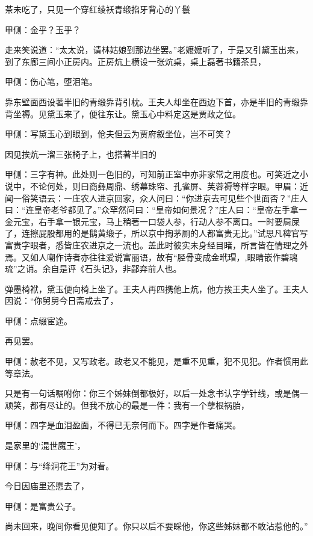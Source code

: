 \begin{parag}
    茶未吃了，只见一个穿红绫袄青缎掐牙背心的丫鬟\begin{note}甲侧：金乎？玉乎？\end{note}走来笑说道：“太太说，请林姑娘到那边坐罢。”老嬷嬷听了，于是又引黛玉出来，到了东廊三间小正房内。正房炕上横设一张炕桌，桌上磊著书籍茶具，\begin{note}甲侧：伤心笔，堕泪笔。\end{note}靠东壁面西设著半旧的青缎靠背引枕。王夫人却坐在西边下首，亦是半旧的青缎靠背坐褥。见黛玉来了，便往东让。黛玉心中料定这是贾政之位。\begin{note}甲侧：写黛玉心到眼到，伧夫但云为贾府叙坐位，岂不可笑？\end{note}因见挨炕一溜三张椅子上，也搭著半旧的\begin{note}甲侧：三字有神。此处则一色旧的，可知前正室中亦非家常之用度也。可笑近之小说中，不论何处，则曰商彝周鼎、绣幕珠帘、孔雀屏、芙蓉褥等样字眼。甲眉：近闻一俗笑语云：一庄农人进京回家，众人问曰：“你进京去可见些个世面否？”庄人曰：“连皇帝老爷都见了。”众罕然问曰：“皇帝如何景况？”庄人曰：“皇帝左手拿一金元宝，右手拿一银元宝，马上稍著一口袋人参，行动人参不离口。一时要屙屎了，连擦屁股都用的是鹅黄缎子，所以京中掏茅厕的人都富贵无比。”试思凡稗官写富贵字眼者，悉皆庄农进京之一流也。盖此时彼实未身经目睹，所言皆在情理之外焉。又如人嘲作诗者亦往往爱说富丽语，故有“胫骨变成金玳瑁，,眼睛嵌作碧璃琉”之诮。余自是评《石头记》，非鄙弃前人也。\end{note}弹墨椅袱，黛玉便向椅上坐了。王夫人再四携他上炕，他方挨王夫人坐了。王夫人因说：“你舅舅今日斋戒去了，\begin{note}甲侧：点缀宦途。\end{note}再见罢。\begin{note}甲侧：赦老不见，又写政老。政老又不能见，是重不见重，犯不见犯。作者惯用此等章法。\end{note}只是有一句话嘱咐你：你三个姊妹倒都极好，以后一处念书认字学针线，或是偶一顽笑，都有尽让的。但我不放心的最是一件：我有一个孽根祸胎，\begin{note}甲侧：四字是血泪盈面，不得已无奈何而下。四字是作者痛哭。\end{note}是家里的‘混世魔王’，\begin{note}甲侧：与“绛洞花王”为对看。\end{note}今日因庙里还愿去了，\begin{note}甲侧：是富贵公子。\end{note}尚未回来，晚间你看见便知了。你只以后不要睬他，你这些姊妹都不敢沾惹他的。”
\end{parag}


